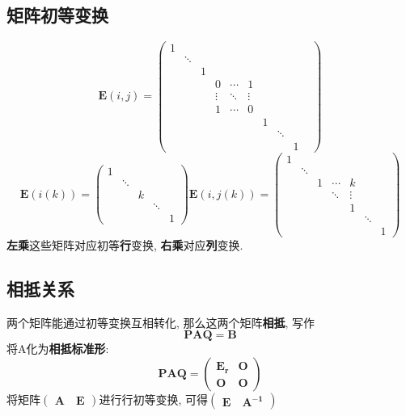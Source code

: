 \documentclass{article}
\begin{document}
		\subsection{矩阵初等变换}
			$$
			\boldsymbol{E}(i, j)=\left(
			\begin{array}{cccccccccc}
				1 & & & & & & & & \\
				& \ddots & & & & & & & & \\
				& & 1 & & & & & & & \\
				& & & 0 & \cdots & 1 & & & & \\
				& & & \vdots & \ddots & \vdots & & & & \\
				& & & 1 & \cdots & 0 & & & \\
				& & & & & & 1 & & \\
				& & & & & & & \ddots & \\
				& & & & & & & & 1
			\end{array}\right)
			$$
			$$
			\boldsymbol{E}(i(k))=\left(
			\begin{array}{ccccc}
				1 & & & & \\
				& \ddots & & & \\
				& & k & & \\
				& & & \ddots & \\
				& & & & 1
			\end{array}\right)
			\boldsymbol{E}(i, j(k))=\left(\begin{array}{cccccccc}
				1 & & & & & \\
				& \ddots & & & & & \\
				& & 1 & \cdots & k & & \\
				& & & \ddots & \vdots & & \\
				& & & & 1 & & \\
				& & & & & \ddots & \\
				& & & & & & 1
			\end{array}\right)
			$$
			\noindent \textbf{左乘}这些矩阵对应初等\textbf{行}变换, \textbf{右乘}对应\textbf{列}变换.
		\subsection{相抵关系}
			两个矩阵能通过初等变换互相转化, 那么这两个矩阵\textbf{相抵}, 写作
			$$
			\boldsymbol{P}\boldsymbol{A}\boldsymbol{Q} = \boldsymbol{B}
			$$
			将A化为\textbf{相抵标准形}:
			$$
			\boldsymbol{P}\boldsymbol{A}\boldsymbol{Q}=
			\left(\begin{array}{cc}
				\boldsymbol{E_{r}} &\boldsymbol{O} \\
				\boldsymbol{O} &\boldsymbol{O}
			\end{array}\right)
			$$
			将矩阵$\left(\begin{array}{c}\boldsymbol{A}\quad\boldsymbol{E}\end{array}\right)$进行行初等变换, 可得$\left(\begin{array}{c}\boldsymbol{E}\quad\boldsymbol{A^{-1}}\end{array}\right)$
\end{document}
